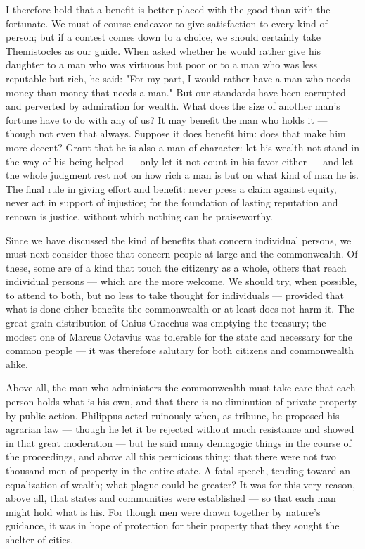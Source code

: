  I therefore hold that a benefit is better placed with the good than with the fortunate. We must of course endeavor to give satisfaction to every kind of person; but if a contest comes down to a choice, we should certainly take Themistocles as our guide. When asked whether he would rather give his daughter to a man who was virtuous but poor or to a man who was less reputable but rich, he said: "For my part, I would rather have a man who needs money than money that needs a man." But our standards have been corrupted and perverted by admiration for wealth. What does the size of another man's fortune have to do with any of us? It may benefit the man who holds it — though not even that always. Suppose it does benefit him: does that make him more decent? Grant that he is also a man of character: let his wealth not stand in the way of his being helped — only let it not count in his favor either — and let the whole judgment rest not on how rich a man is but on what kind of man he is. The final rule in giving effort and benefit: never press a claim against equity, never act in support of injustice; for the foundation of lasting reputation and renown is justice, without which nothing can be praiseworthy.

 Since we have discussed the kind of benefits that concern individual persons, we must next consider those that concern people at large and the commonwealth. Of these, some are of a kind that touch the citizenry as a whole, others that reach individual persons — which are the more welcome. We should try, when possible, to attend to both, but no less to take thought for individuals — provided that what is done either benefits the commonwealth or at least does not harm it. The great grain distribution of Gaius Gracchus was emptying the treasury; the modest one of Marcus Octavius was tolerable for the state and necessary for the common people — it was therefore salutary for both citizens and commonwealth alike.

 Above all, the man who administers the commonwealth must take care that each person holds what is his own, and that there is no diminution of private property by public action. Philippus acted ruinously when, as tribune, he proposed his agrarian law — though he let it be rejected without much resistance and showed in that great moderation — but he said many demagogic things in the course of the proceedings, and above all this pernicious thing: that there were not two thousand men of property in the entire state. A fatal speech, tending toward an equalization of wealth; what plague could be greater? It was for this very reason, above all, that states and communities were established — so that each man might hold what is his. For though men were drawn together by nature's guidance, it was in hope of protection for their property that they sought the shelter of cities.


